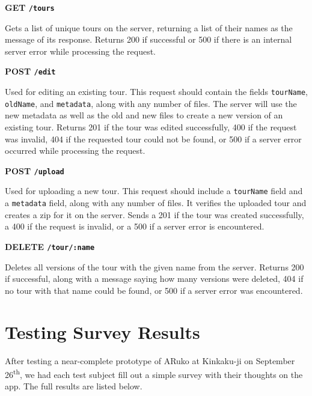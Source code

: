 \documentclass[a4paper, 10pt, american, titlepage]{article}
\newenvironment{indented}[1]%
{\begin{list}{}%
	{\setlength{\leftmargin}{#1}}%
	\item[]%
}
{\end{list}}
\begin{document}
\noindent\textbf{GET \texttt{/tours}}

\begin{indented}{1cm}
	Gets a list of unique tours on the server, returning a list of their names
	as the message of its response. Returns 200 if successful or 500 if there is
	an internal server error while processing the request.
\end{indented}

\noindent\textbf{POST \texttt{/edit}}

\begin{indented}{1cm}
	Used for editing an existing tour. This request should contain the fields
	\texttt{tourName}, \texttt{oldName}, and \texttt{metadata}, along with any
	number of files.  The server will use the new metadata as well as the old
	and new files to create a new version of an existing tour. Returns 201 if
	the tour was edited successfully, 400 if the request was invalid, 404 if the
	requested tour could not be found, or 500 if a server error occurred while
	processing the request.
\end{indented}

\noindent\textbf{POST \texttt{/upload}}

\begin{indented}{1cm}
	Used for uploading a new tour. This request should include a
	\texttt{tourName} field and a \texttt{metadata} field, along with any number
	of files. It verifies the uploaded tour and creates a zip for it on the
	server. Sends a 201 if the tour was created successfully, a 400 if the
	request is invalid, or a 500 if a server error is encountered.
\end{indented}

\noindent\textbf{DELETE \texttt{/tour/:name}}

\begin{indented}{1cm}
	Deletes all versions of the tour with the given name from the server.
	Returns 200 if successful, along with a message saying how many versions
	were deleted, 404 if no tour with that name could be found, or 500 if a
	server error was encountered.
\end{indented}

\clearpage

\section{Testing Survey Results}
\label{sec:testingSurveyResults}

After testing a near-complete prototype of ARuko at Kinkaku-ji on September
26\textsuperscript{th}, we had each test subject fill out a simple survey with
their thoughts on the app. The full results are listed below.
\end{document}
